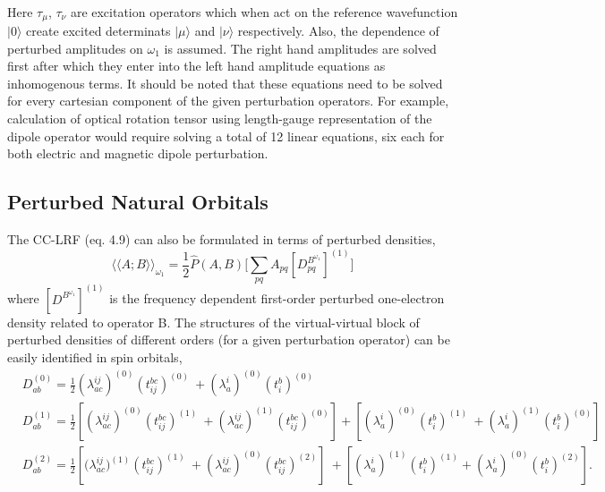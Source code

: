 \\
Here $\tau_\mu$, $\tau_\nu$ are excitation operators which when act on the
reference wavefunction $|0\rangle$ create excited determinats $|\mu\rangle$ 
and $|\nu\rangle$ respectively. Also, the dependence of perturbed amplitudes
 on $\omega_1$ is assumed. The right hand amplitudes are solved first after 
which they enter into the left hand amplitude equations as inhomogenous terms. 
It should be noted that these equations need to be solved for every cartesian 
component of the given perturbation operators. For example, calculation of 
optical rotation tensor using length-gauge representation of the dipole 
operator would require solving a total of 12 linear equations, six each 
for both electric and magnetic dipole perturbation.
\subsection{Perturbed Natural Orbitals}
The CC-LRF (eq. 4.9) can also be formulated in terms of perturbed densities,
\begin{equation}
{\langle\langle A;B\rangle\rangle}_{\omega_1} =  \frac{1}{2}\hat{P}(A,B)\big[\sum_{pq} A_{pq}[{D^{B^{\omega_1}}_{pq}}]^{(1)}\big]
\end{equation}
where $[{D^{B^{\omega_1}}}]^{(1)}$ is the frequency dependent first-order
perturbed one-electron density related to operator B. The structures  
of the virtual-virtual block of perturbed densities of different orders
(for a given perturbation operator) can be easily identified in spin orbitals,
\\
\begin{equation}
\begin{split}
& D^{(0)}_{ab} = \frac{1}{2}(\lambda^{ij}_{ac})^{(0)}(t^{bc}_{ij})^{(0)} \
+ (\lambda^{i}_{a})^{(0)}(t^{b}_{i})^{(0)} \\
&D^{(1)}_{ab} = \frac{1}{2}[(\lambda^{ij}_{ac})^{(0)}(t^{bc}_{ij})^{(1)} \
+ (\lambda^{ij}_{ac})^{(1)}(t^{bc}_{ij})^{(0)}] + [(\lambda^{i}_{a})^{(0)}(t^{b}_{i})^{(1)}\
 + (\lambda^{i}_{a})^{(1)}(t^{b}_{i})^{(0)}] \\
&D^{(2)}_{ab} = \frac{1}{2}[{(\lambda^{ij}_{ac}})^{(1)}(t^{bc}_{ij})^{(1)}\
 + (\lambda^{ij}_{ac})^{(0)}(t^{bc}_{ij})^{(2)}]\ 
+ [(\lambda^{i}_{a})^{(1)} (t^{b}_{i})^{(1)} + (\lambda^{i}_{a})^{(0)}(t^{b}_{i})^{(2)}].\\
\end{split}
\end{equation}
